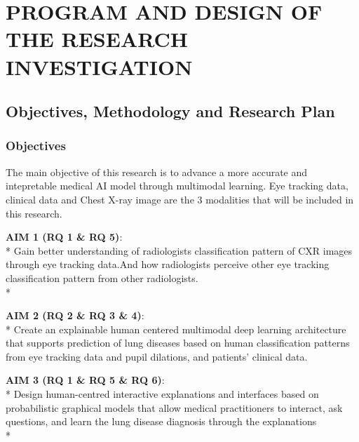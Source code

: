 \section{PROGRAM AND DESIGN OF THE RESEARCH INVESTIGATION}
\label{sec:research-design}

\subsection{Objectives, Methodology and Research Plan}

\subsubsection{Objectives}
The main objective of this research is to advance a more accurate and intepretable medical AI model through multimodal learning. Eye tracking data, clinical data and Chest X-ray image are the 3 modalities that will be included in this research.

\textbf{AIM 1 (RQ 1 \& RQ 5)}:\\*
Gain better understanding of radiologists classification pattern of CXR images through eye tracking data.And how radiologists perceive other eye tracking classification pattern from other radiologists. \\* 

\noindent
\textbf{AIM 2 (RQ 2 \& RQ 3 \& 4)}:\\*
 Create an explainable human centered multimodal deep learning architecture that supports prediction of lung diseases based on human classification patterns from eye tracking data and pupil dilations, and patients' clinical data.
\noindent


\textbf{AIM 3 (RQ 1 \& RQ 5 \& RQ 6)}:\\*
Design human-centred interactive explanations and interfaces based on probabilistic graphical models that allow medical practitioners to interact, ask questions, and learn the lung disease diagnosis through the explanations \\*

